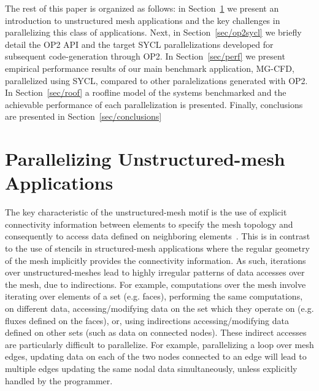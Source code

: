 \documentclass[runningheads]{llncs}
\begin{document}
The rest of this paper is organized as follows: in Section~\ref{sec/um} 
we present an introduction to unstructured mesh applications and the key 
challenges in parallelizing this class of applications. Next, in 
Section~\ref{sec/op2sycl} we briefly detail the OP2 API and the target SYCL 
parallelizations developed for subsequent code-generation through OP2. In 
Section~\ref{sec/perf} we present empirical performance results of our main 
benchmark application, MG-CFD, parallelized using SYCL, compared to other 
paralelizations generated with OP2. In Section~\ref{sec/roof} a roofline model 
of the systems benchmarked and the achievable performance of each parallelization 
is presented. Finally, conclusions are presented in 
Section~\ref{sec/conclusions}


\vspace{-10pt}
\section{Parallelizing Unstructured-mesh 
Applications}\label{sec/um}\vspace{-5pt}

\noindent The key characteristic of the unstructured-mesh motif is the use of 
explicit connectivity information between elements to specify the mesh topology 
and consequently to access data defined on neighboring 
elements~\cite{Colella2004}. This is in contrast to the use of stencils in 
structured-mesh applications where the regular geometry of the mesh implicitly 
provides the connectivity information. As such, iterations over 
unstructured-meshes lead to highly irregular patterns of data accesses over 
the mesh, due to indirections. For example, computations over the mesh involve 
iterating over elements of a set (e.g. faces), performing the same computations, 
on different data, accessing/modifying data on the set which they operate on 
(e.g. fluxes defined on the faces), or, using indirections accessing/modifying 
data defined on other sets (such as data on connected nodes). These indirect 
accesses are particularly difficult to parallelize. For example, parallelizing a 
loop over mesh edges, updating data on each of the two nodes connected to an 
edge will lead to multiple edges updating the same nodal data simultaneously, 
unless explicitly handled by the programmer.
\end{document}
